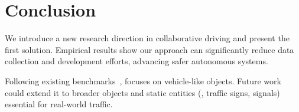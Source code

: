 \section{Conclusion}
\label{sec:conclusion}
\vspace{-2.5mm}
We introduce a new research direction in collaborative driving and present the first solution. Empirical results show our approach can significantly reduce data collection and development efforts, advancing safer autonomous systems. 

Following existing benchmarks~\citep{xu2022opv2v, xu2023v2v4real}, \ours focuses on vehicle-like objects. Future work could extend it to broader objects and static entities (\eg, traffic signs, signals) essential for real-world traffic.
